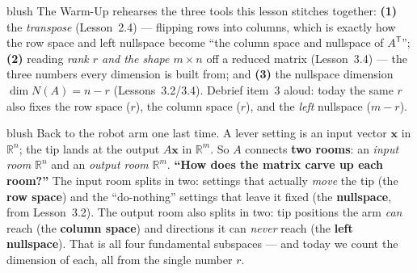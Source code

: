 \documentclass[10pt]{article}
\newcommand{\xx}{\mathbf{x}}
\newcommand{\T}{\mathsf{T}}
\begin{document}
\begin{fixedskillbox}{blush}
    The Warm-Up rehearses the three tools this lesson stitches together: \textbf{(1)} the \emph{transpose}
    (Lesson~2.4) --- flipping rows into columns, which is exactly how the row space and left nullspace
    become ``the column space and nullspace of $A^{\T}$''; \textbf{(2)} reading \emph{rank $r$ and the shape
    $m\times n$} off a reduced matrix (Lesson~3.4) --- the three numbers every dimension is built from; and
    \textbf{(3)} the nullspace dimension $\dim N(A)=n-r$ (Lessons~3.2/3.4). Debrief item~3 aloud: today the
    same $r$ also fixes the row space ($r$), the column space ($r$), and the \emph{left} nullspace ($m-r$).
\end{fixedskillbox}

\begin{skillbox}[Hook]{blush}
    Back to the robot arm one last time. A lever setting is an input vector $\xx$ in $\mathbb{R}^n$; the tip
    lands at the output $A\xx$ in $\mathbb{R}^m$. So $A$ connects \textbf{two rooms}: an \emph{input room}
    $\mathbb{R}^n$ and an \emph{output room} $\mathbb{R}^m$. \textbf{``How does the matrix carve up each
    room?''} The input room splits in two: settings that actually \emph{move} the tip (the \textbf{row
    space}) and the ``do-nothing'' settings that leave it fixed (the \textbf{nullspace}, from Lesson~3.2).
    The output room also splits in two: tip positions the arm \emph{can} reach (the \textbf{column space})
    and directions it can \emph{never} reach (the \textbf{left nullspace}). That is all four fundamental
    subspaces --- and today we count the dimension of each, all from the single number $r$.
\end{skillbox}
\end{document}
